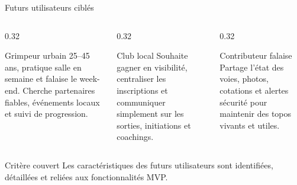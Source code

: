 \documentclass[aspectratio=169,11pt]{beamer}
\begin{document}
\begin{frame}{Futurs utilisateurs ciblés}
  \begin{columns}[T]
    \begin{column}{0.32\textwidth}
      \begin{block}{Grimpeur urbain}
        \small
        25--45 ans, pratique salle en semaine et falaise le week-end. Cherche partenaires fiables, événements locaux et suivi de progression.
      \end{block}
    \end{column}
    \begin{column}{0.32\textwidth}
      \begin{block}{Club local}
        \small
        Souhaite gagner en visibilité, centraliser les inscriptions et communiquer simplement sur les sorties, initiations et coachings.
      \end{block}
    \end{column}
    \begin{column}{0.32\textwidth}
      \begin{block}{Contributeur falaise}
        \small
        Partage l'état des voies, photos, cotations et alertes sécurité pour maintenir des topos vivants et utiles.
      \end{block}
    \end{column}
  \end{columns}
  \vspace{0.3cm}
  \begin{block}{Critère couvert}
    Les caractéristiques des futurs utilisateurs sont identifiées, détaillées et reliées aux fonctionnalités MVP.
  \end{block}
\end{frame}
\end{document}
